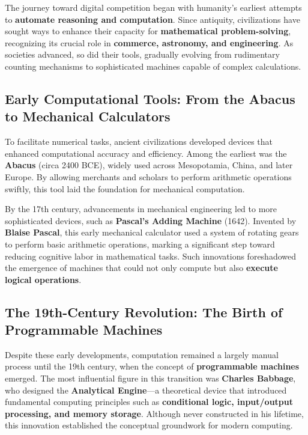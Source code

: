 The journey toward digital competition began with humanity’s earliest attempts to \textbf{automate reasoning and computation}. Since antiquity, civilizations have sought ways to enhance their capacity for \textbf{mathematical problem-solving}, recognizing its crucial role in \textbf{commerce, astronomy, and engineering}. As societies advanced, so did their tools, gradually evolving from rudimentary counting mechanisms to sophisticated machines capable of complex calculations.

\subsection{Early Computational Tools: From the Abacus to Mechanical Calculators}

To facilitate numerical tasks, ancient civilizations developed devices that enhanced computational accuracy and efficiency. Among the earliest was the \textbf{Abacus} (circa 2400 BCE), widely used across Mesopotamia, China, and later Europe. By allowing merchants and scholars to perform arithmetic operations swiftly, this tool laid the foundation for mechanical computation.

By the 17th century, advancements in mechanical engineering led to more sophisticated devices, such as \textbf{Pascal’s Adding Machine} (1642). Invented by \textbf{Blaise Pascal}, this early mechanical calculator used a system of rotating gears to perform basic arithmetic operations, marking a significant step toward reducing cognitive labor in mathematical tasks. Such innovations foreshadowed the emergence of machines that could not only compute but also \textbf{execute logical operations}.

\subsection{The 19th-Century Revolution: The Birth of Programmable Machines}

Despite these early developments, computation remained a largely manual process until the 19th century, when the concept of \textbf{programmable machines} emerged. The most influential figure in this transition was \textbf{Charles Babbage}, who designed the \textbf{Analytical Engine}—a theoretical device that introduced fundamental computing principles such as \textbf{conditional logic, input/output processing, and memory storage}. Although never constructed in his lifetime, this innovation established the conceptual groundwork for modern computing.

